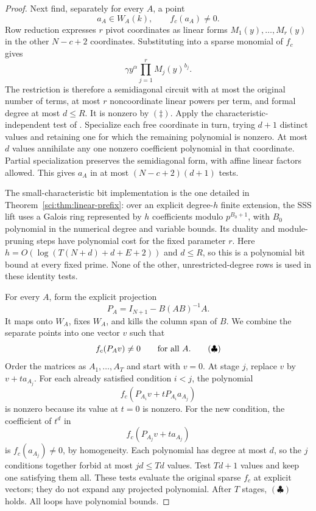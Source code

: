 \begin{proof}
Next find, separately for every \(A\), a point
\[
 a_A\in W_A(k),\qquad f_c(a_A)\ne0.
\]
Row reduction expresses \(r\) pivot coordinates as linear forms
\(M_1(y),\ldots,M_r(y)\) in the other \(N-c+2\) coordinates.
Substituting into a sparse monomial of \(f_c\) gives
\[
 \gamma y^\alpha\prod_{j=1}^r M_j(y)^{b_j}.
\]
The restriction is therefore a semidiagonal circuit with at most the
original number of terms, at most \(r\) noncoordinate linear powers
per term, and formal degree at most \(d\leq R\). It is nonzero by
\((\ddagger)\). Apply the characteristic-independent test of
\citet[Definition~1.1, Corollary~3.3, and \S6,
Theorems~6.3 and~6.5]{sci-sss}. Specialize each free coordinate in
turn, trying \(d+1\) distinct values and retaining one for which the
remaining polynomial is nonzero. At most \(d\) values annihilate
any one nonzero coefficient polynomial in that coordinate. Partial
specialization preserves the semidiagonal form, with affine linear
factors allowed. This gives \(a_A\) in at most
\((N-c+2)(d+1)\) tests.

The small-characteristic bit implementation is the one detailed in
Theorem~\ref{sci:thm:linear-prefix}: over an explicit degree-\(h\)
finite extension, the SSS lift uses a Galois ring represented by \(h\)
coefficients modulo \(p^{B_0+1}\), with \(B_0\) polynomial in the
numerical degree and variable bounds. Its duality and module-pruning
steps have polynomial cost for the fixed parameter \(r\).
Here \(h=O(\log(T(N+d)+d+E+2))\) and \(d\leq R\), so this is a
polynomial bit bound at every fixed prime. None of the other,
unrestricted-degree rows is used in these identity tests.

For every \(A\), form the explicit projection
\[
 P_A=I_{N+1}-B(AB)^{-1}A.
\]
It maps onto \(W_A\), fixes \(W_A\), and kills the column span of
\(B\). We combine the separate points into one vector \(v\) such
that
\[
 f_c(P_Av)\ne0\qquad\hbox{for all }A.
 \tag{\(\clubsuit\)}
\]
Order the matrices as \(A_1,\ldots,A_T\) and start with \(v=0\).
At stage \(j\), replace \(v\) by \(v+t a_{A_j}\).
For each already satisfied condition \(i<j\), the polynomial
\[
 f_c(P_{A_i}v+tP_{A_i}a_{A_j})
\]
is nonzero because its value at \(t=0\) is nonzero. For the new
condition, the coefficient of \(t^d\) in
\[
 f_c(P_{A_j}v+t a_{A_j})
\]
is \(f_c(a_{A_j})\ne0\), by homogeneity. Each polynomial has degree
at most \(d\), so the \(j\) conditions together forbid at most
\(jd\leq Td\) values. Test \(Td+1\) values and keep one satisfying
them all. These tests evaluate the original sparse \(f_c\) at explicit
vectors; they do not expand any projected polynomial. After \(T\)
stages, \((\clubsuit)\) holds. All loops have polynomial bounds.


\end{proof}
